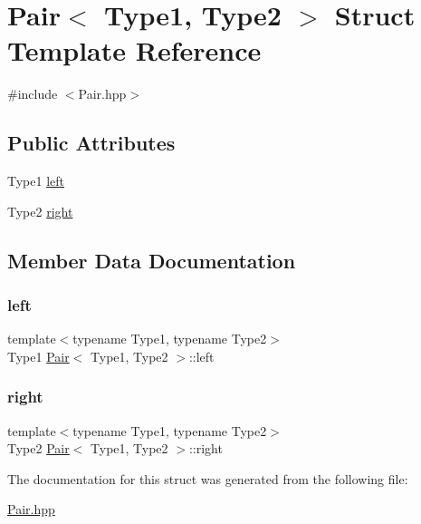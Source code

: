 \hypertarget{structPair}{}\section{Pair$<$ Type1, Type2 $>$ Struct Template Reference}
\label{structPair}


{\ttfamily \#include $<$Pair.\+hpp$>$}

\subsection*{Public Attributes}
\begin{DoxyCompactItemize}
\item 
Type1 \hyperlink{structPair_ab86bfd58f33f33e03e21d7155efac004}{left}
\item 
Type2 \hyperlink{structPair_aaf0031924cde3a4eeefeecea7c7caaf0}{right}
\end{DoxyCompactItemize}


\subsection{Member Data Documentation}
\mbox{\label{structPair_ab86bfd58f33f33e03e21d7155efac004}} 
\subsubsection{\texorpdfstring{left}{left}}
{\footnotesize\ttfamily template$<$typename Type1, typename Type2$>$ \\
Type1 \hyperlink{structPair}{Pair}$<$ Type1, Type2 $>$\+::left}

\mbox{\label{structPair_aaf0031924cde3a4eeefeecea7c7caaf0}} 
\subsubsection{\texorpdfstring{right}{right}}
{\footnotesize\ttfamily template$<$typename Type1, typename Type2$>$ \\
Type2 \hyperlink{structPair}{Pair}$<$ Type1, Type2 $>$\+::right}



The documentation for this struct was generated from the following file\+:\begin{DoxyCompactItemize}
\item 
\hyperlink{Pair_8hpp}{Pair.\+hpp}\end{DoxyCompactItemize}
